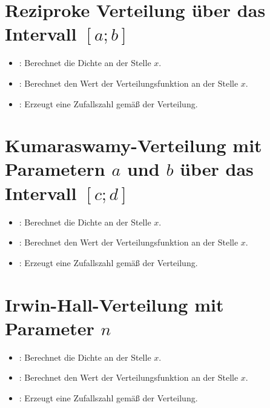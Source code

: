 \section{Reziproke Verteilung über das Intervall \texorpdfstring{$[a;b]$}{[a;b]}}

\begin{itemize}

\item
{}:
Berechnet die Dichte an der Stelle $x$.

\item
{}:
Berechnet den Wert der Verteilungsfunktion an der Stelle $x$.

\item
{}:
Erzeugt eine Zufallszahl gemäß der Verteilung.

\end{itemize}



\section{Kumaraswamy-Verteilung mit Parametern \texorpdfstring{$a$}{a} und \texorpdfstring{$b$}{b} über das Intervall \texorpdfstring{$[c;d]$}{[c;d]}}

\begin{itemize}

\item
{}:
Berechnet die Dichte an der Stelle $x$.

\item
{}:
Berechnet den Wert der Verteilungsfunktion an der Stelle $x$.

\item
{}:
Erzeugt eine Zufallszahl gemäß der Verteilung.

\end{itemize}



\section{Irwin-Hall-Verteilung mit Parameter \texorpdfstring{$n$}{n}}

\begin{itemize}

\item
{}:
Berechnet die Dichte an der Stelle $x$.

\item
{}:
Berechnet den Wert der Verteilungsfunktion an der Stelle $x$.

\item
{}:
Erzeugt eine Zufallszahl gemäß der Verteilung.

\end{itemize}



